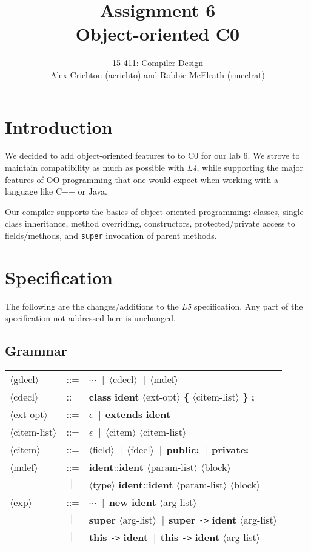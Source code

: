 \documentclass{article}
\title{Assignment 6\\ Object-oriented C0}
\author{15-411: Compiler Design\\
Alex Crichton (acrichto) and Robbie McElrath (rmcelrat)}
\newcommand{\nonterm}[1]{$\langle${#1}$\rangle$}
\newcommand{\term}[1]{\textbf {#1}}
\newcommand{\OR}{\ensuremath{\ | \ \ }}
\begin{document}
\maketitle
\renewcommand{\baselinestretch}{1.5}

\section{Introduction}

We decided to add object-oriented features to to C0 for our lab 6. We strove to
maintain compatibility as much as possible with \emph{L4}, while supporting the
major features of OO programming that one would expect when working with a
language like C++ or Java.

Our compiler supports the basics of object oriented programming: classes,
single-class inheritance, method overriding, constructors, protected/private
access to fields/methods, and \texttt{super} invocation of parent methods.

\section{Specification}
The following are the changes/additions to the \emph{L5} specification. Any part
of the specification not addressed here is unchanged.

\subsection{Grammar}
\renewcommand{\arraystretch}{1.4}
\begin{tabular}{lcl}
  \nonterm{gdecl}      & ::= & $\cdots$ \OR \nonterm{cdecl} \OR \nonterm{mdef} \\
  \nonterm{cdecl}      & ::= & \term{class} \term{ident} \nonterm{ext-opt} \term{\{} \nonterm{citem-list} \term{\}} \term{;} \\
  \nonterm{ext-opt}    & ::= & $\epsilon$ \OR \term{extends} \term{ident} \\
  \nonterm{citem-list} & ::= & $\epsilon$ \OR \nonterm{citem} \nonterm{citem-list} \\
  \nonterm{citem}      & ::= & \nonterm{field} \OR \nonterm{fdecl} \OR \term{public:} \OR \term{private:} \\
  \nonterm{mdef}       & ::= & \term{ident}::\term{ident} \nonterm{param-list} \nonterm{block} \\
                       & \OR & \nonterm{type} \term{ident}::\term{ident} \nonterm{param-list} \nonterm{block} \\
  \nonterm{exp}        & ::= & $\cdots$ \OR \term{new} \term{ident} \nonterm{arg-list} \\
                       & \OR & \term{super}  \nonterm{arg-list} \OR \term{super} \verb"->" \term{ident} \nonterm{arg-list} \\
                       & \OR & \term{this} \verb"->" \term{ident} \OR \term{this} \verb"->" \term{ident} \nonterm{arg-list} \\
\end{tabular}
\end{document}
